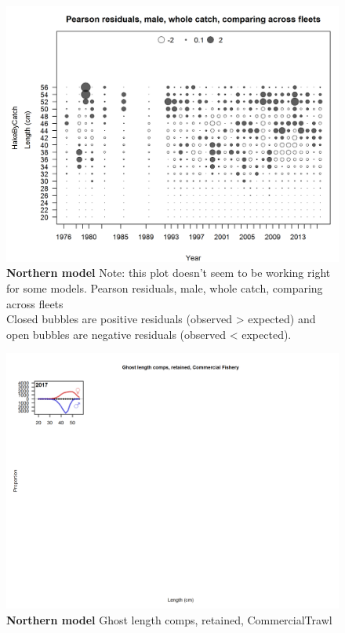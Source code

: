 \documentclass[12pt,]{article}
\begin{document}
\begin{figure}[htbp]
\centering
\includegraphics{./r4ss/plots_mod1/comp_lenfit_sex3mkt0_multi-fleet_comparison.png}
\caption{\textbf{Northern model} Note: this plot doesn't seem to be
working right for some models. Pearson residuals, male, whole catch,
comparing across fleets\\
Closed bubbles are positive residuals (observed \textgreater{} expected)
and open bubbles are negative residuals (observed \textless{} expected).
\label{fig:mod1_38_comp_lenfit_sex3mkt0_multi-fleet_comparison}}
\end{figure}

\begin{figure}[htbp]
\centering
\includegraphics{./r4ss/plots_mod1/comp_gstlenfit_flt1mkt2.png}
\caption{\textbf{Northern model} Ghost length comps, retained,
CommercialTrawl \label{fig:mod1_39_comp_gstlenfit_flt1mkt2}}
\end{figure}
\end{document}
